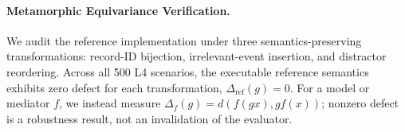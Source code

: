 \paragraph{Metamorphic Equivariance Verification.}
We audit the reference implementation under three semantics-preserving transformations: record-ID bijection, irrelevant-event insertion, and distractor reordering. Across all 500 L4 scenarios, the executable reference semantics exhibits zero defect for each transformation, $\Delta_{\mathrm{ref}}(g)=0$. For a model or mediator $f$, we instead measure $\Delta_f(g)=d(f(gx),g f(x))$; nonzero defect is a robustness result, not an invalidation of the evaluator.
